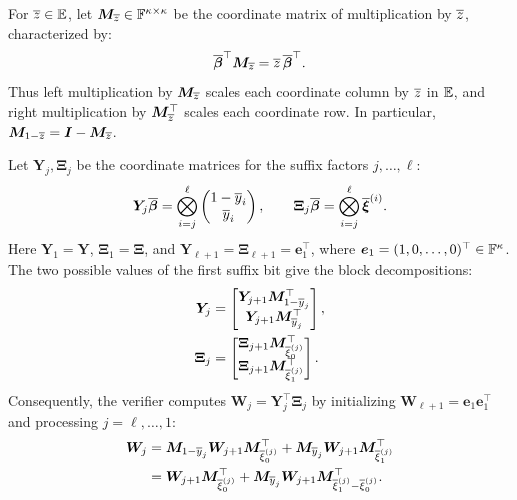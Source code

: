 For \(\overline{z}\in\mathbb{E}\), let
\(\bm M_{\overline{z}}\in{\mathbb{F}}^{\kappa\times\kappa}\) be the coordinate
matrix of multiplication by \(\overline{z}\), characterized by:
\begin{equation}
    \overline{\bm\beta}^{\top}\bm M_{\overline{z}}
    =\overline{z}\,\overline{\bm\beta}^{\top}.
\label{eq:pcs-multiplication-matrix}
\end{equation}
Thus left multiplication by \(\bm M_{\overline{z}}\) scales each
coordinate column by \(\overline{z}\) in \(\mathbb{E}\), and right
multiplication by \(\bm M_{\overline{z}}^\top\) scales each coordinate row.
In particular, \(\bm M_{1-\overline{z}}=\bm I-\bm M_{\overline{z}}\).

Let \(\bm Y_j,\bm\Xi_j\) be the coordinate matrices for the
suffix factors \(j,\ldots,\ell\):
\[
    \bm Y_j\overline{\bm\beta}
    =\bigotimes_{i=j}^{\ell}
        \begin{pmatrix}1-\overline{y}_i\\ \overline{y}_i\end{pmatrix},
    \qquad
    \bm\Xi_j\overline{\bm\beta}
    =\bigotimes_{i=j}^{\ell}\overline{\bm\xi}^{(i)}.
\]
Here \(\bm Y_1=\bm Y\), \(\bm\Xi_1=\bm\Xi\), and
\(\bm Y_{\ell+1}=\bm\Xi_{\ell+1}=\bm e_1^\top\), where
\(\bm e_1=(1,0,\ldots,0)^\top\in{\mathbb{F}}^\kappa\).
The two possible values of the first suffix bit give the block
decompositions:
\begin{equation}
\begin{aligned}
    \bm Y_j
    &=
    \begin{bmatrix}
        \bm Y_{j+1}\bm M_{1-\overline{y}_j}^\top\\
        \bm Y_{j+1}\bm M_{\overline{y}_j}^\top
    \end{bmatrix},\\
    \bm\Xi_j
    &=
    \begin{bmatrix}
        \bm\Xi_{j+1}\bm M_{\overline{\xi}^{(j)}_0}^\top\\
        \bm\Xi_{j+1}\bm M_{\overline{\xi}^{(j)}_1}^\top
    \end{bmatrix}.
\end{aligned}
\label{eq:pcs-query-blocks}
\end{equation}
Consequently, the verifier computes
\(\bm W_j=\bm Y_j^\top\bm\Xi_j\) by initializing
\(\bm W_{\ell+1}=\bm e_1\bm e_1^\top\) and processing
\(j=\ell,\ldots,1\):
\begin{equation}
\begin{aligned}
    \bm W_j
    &=
    \bm M_{1-\overline{y}_j}\bm W_{j+1}
        \bm M_{\overline{\xi}^{(j)}_0}^\top
    +\bm M_{\overline{y}_j}\bm W_{j+1}
        \bm M_{\overline{\xi}^{(j)}_1}^\top\\
    &=
    \bm W_{j+1}\bm M_{\overline{\xi}^{(j)}_0}^\top
    +\bm M_{\overline{y}_j}\bm W_{j+1}
        \bm M_{\overline{\xi}^{(j)}_1-\overline{\xi}^{(j)}_0}^\top.
\end{aligned}
\label{eq:pcs-query-recurrence}
\end{equation}
